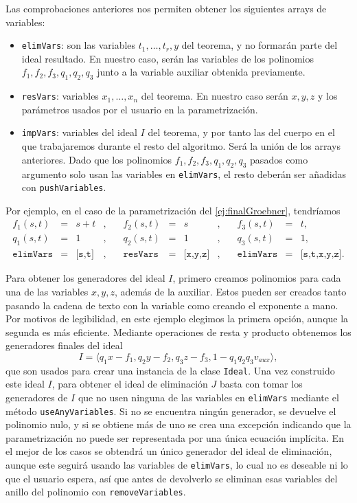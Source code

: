 Las comprobaciones anteriores nos permiten obtener los siguientes arrays de variables:
\begin{itemize}
    \item \texttt{elimVars}: son las variables $t_1,\dots, t_r,y$ del teorema, y no formarán parte del ideal resultado. En nuestro caso, serán las variables de los polinomios $f_1,f_2,f_3,q_1,q_2,q_3$ junto a la variable auxiliar obtenida previamente.
    \item \texttt{resVars}: variables $x_1,\dots, x_n$ del teorema. En nuestro caso serán $x,y,z$ y los parámetros usados por el usuario en la parametrización.
    \item \texttt{impVars}: variables del ideal $I$ del teorema, y por tanto las del cuerpo en el que trabajaremos durante el resto del algoritmo. Será la unión de los arrays anteriores. Dado que los polinomios $f_1,f_2,f_3,q_1,q_2,q_3$ pasados como argumento solo usan las variables en \texttt{elimVars}, el resto deberán ser añadidas con \texttt{pushVariables}.
\end{itemize}
Por ejemplo, en el caso de la parametrización del \autoref{ej:finalGroebner}, tendríamos
\begin{align*}
    f_1(s,t)&=&s+t&,\quad &f_2(s,t)&=&s&,\quad &f_3(s,t)&=&t,\\[7pt]
    q_1(s,t)&=&1&,\quad &q_2(s,t)&=&1&,\quad &q_3(s,t)&=&1,\\[7pt]
    \texttt{elimVars}&=&\texttt{[s,t]}&,\quad &\texttt{resVars}&=&\texttt{[x,y,z]}&,\quad &\texttt{elimVars}&=&\texttt{[s,t,x,y,z]}.
\end{align*}

Para obtener los generadores del ideal $I$, primero creamos polinomios para cada una de las variables $x,y,z$, además de la auxiliar. Estos pueden ser creados tanto pasando la cadena de texto con la variable como creando el exponente a mano. Por motivos de legibilidad, en este ejemplo elegimos la primera opción, aunque la segunda es más eficiente. Mediante operaciones de resta y producto obtenemos los generadores finales del ideal
$$I = \langle q_1x - f_1, q_2y - f_2, q_3z - f_3, 1 - q_1q_2q_3v_{aux}\rangle,$$
que son usados para crear una instancia de la clase \texttt{Ideal}. Una vez construido este ideal $I$, para obtener el ideal de eliminación $J$ basta con tomar los generadores de $I$ que no usen ninguna de las variables en \texttt{elimVars} mediante el método \texttt{useAnyVariables}. Si no se encuentra ningún generador, se devuelve el polinomio nulo, y si se obtiene más de uno se crea una excepción indicando que la parametrización no puede ser representada por una única ecuación implícita. En el mejor de los casos se obtendrá un único generador del ideal de eliminación, aunque este seguirá usando las variables de \texttt{elimVars}, lo cual no es deseable ni lo que el usuario espera, así que antes de devolverlo se eliminan esas variables del anillo del polinomio con \texttt{removeVariables}.\newline


